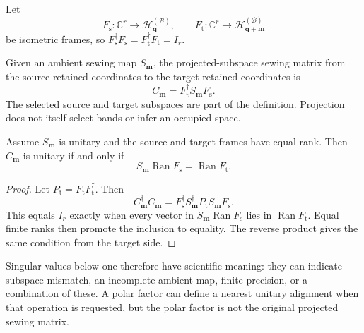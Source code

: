 Let
\begin{equation}
  F_{\mathrm s}:\mathbb C^r\longrightarrow
  \mathcal H_{\mathbf q}^{(\mathcal B)},
  \qquad
  F_{\mathrm t}:\mathbb C^r\longrightarrow
  \mathcal H_{\mathbf q+\mathbf m}^{(\mathcal B)}
\end{equation}
be isometric frames, so
\(F_{\mathrm s}^{\dagger}F_{\mathrm s}
=F_{\mathrm t}^{\dagger}F_{\mathrm t}=I_r\).

\begin{definition}
\label{def:training-projected-subspace-sewing}
Given an ambient sewing map \(S_{\mathbf m}\), the projected-subspace sewing
matrix from the source retained coordinates to the target retained coordinates
is
\begin{equation}
  C_{\mathbf m}
  =F_{\mathrm t}^{\dagger}
   S_{\mathbf m}
   F_{\mathrm s}.
  \label{eq:training-projected-sewing}
\end{equation}
The selected source and target subspaces are part of the definition. Projection
does not itself select bands or infer an occupied space.
\end{definition}

\begin{proposition}
\label{prop:training-projected-sewing-unitary}
Assume \(S_{\mathbf m}\) is unitary and the source and target frames have equal
rank. Then \(C_{\mathbf m}\) is unitary if and only if
\begin{equation}
  S_{\mathbf m}\operatorname{Ran}F_{\mathrm s}
  =\operatorname{Ran}F_{\mathrm t}.
  \label{eq:training-sewn-subspace-equality}
\end{equation}
\end{proposition}

\begin{proof}
Let \(P_{\mathrm t}=F_{\mathrm t}F_{\mathrm t}^{\dagger}\). Then
\begin{equation}
  C_{\mathbf m}^{\dagger}C_{\mathbf m}
  =F_{\mathrm s}^{\dagger}S_{\mathbf m}^{\dagger}
   P_{\mathrm t}S_{\mathbf m}F_{\mathrm s}.
\end{equation}
This equals \(I_r\) exactly when every vector in
\(S_{\mathbf m}\operatorname{Ran}F_{\mathrm s}\) lies in
\(\operatorname{Ran}F_{\mathrm t}\). Equal finite ranks then promote the
inclusion to equality. The reverse product gives the same condition from the
target side.
\end{proof}

Singular values below one therefore have scientific meaning: they can indicate
subspace mismatch, an incomplete ambient map, finite precision, or a combination
of these. A polar factor can define a nearest unitary alignment when that
operation is requested, but the polar factor is not the original projected
sewing matrix.

